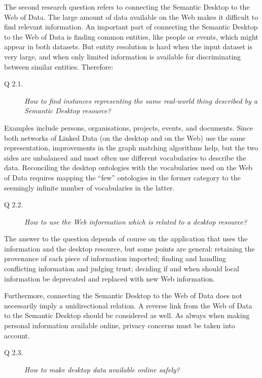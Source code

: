 The second research question refers to connecting the Semantic Desktop to the Web of Data. The large amount of data available on the Web makes it difficult to find relevant information. An important part of connecting the Semantic Desktop to the Web of Data is finding common entities, like people or events, which might appear in both datasets. But entity resolution is hard when the input dataset is very large, and when only limited information is available for discriminating between similar entities. Therefore:

\begin{description}
 \item[Q 2.1.] \emph{How to find instances representing the same real-world thing described by a Semantic Desktop resource?}
\end{description}

Examples include persons, organisations, projects, events, and documents. Since both networks of Linked Data (on the desktop and on the Web) use the same representation, improvements in the graph matching algorithms help, but the two sides are unbalanced and most often use different vocabularies to describe the data.
Reconciling the desktop ontologies with the vocabularies used on the Web of Data requires mapping the ``few'' ontologies in the former category to the seemingly infinite number of vocabularies in the latter. 

\begin{description}
 \item[Q 2.2.] \emph{How to use the Web information which is related to a desktop resource?} 
\end{description}

The answer to the question depends of course on the application that uses the information and the desktop resource, but some points are general: retaining the provenance of each piece of information imported; finding and handling conflicting information and judging trust; deciding if and when should local information be deprecated and replaced with new Web information. 

Furthermore, connecting the Semantic Desktop to the Web of Data does not necessarily imply a unidirectional relation. A reverse link from the Web of Data to the Semantic Desktop should be considered as well. As always when making personal information available online, privacy concerns must be taken into account.

\begin{description}
 \item[Q 2.3.] \emph{How to make desktop data available online safely?}
\end{description}

